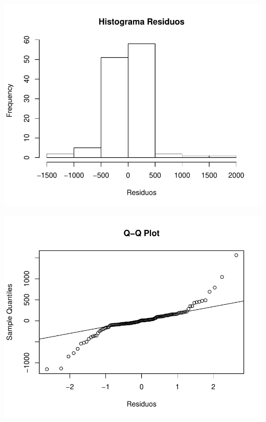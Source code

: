 \documentclass[11pt,a4paper,oneside]{article}\usepackage[]{graphicx}\usepackage[]{color}
\makeatletter
\def\maxwidth{ %
  \ifdim\Gin@nat@width>\linewidth
    \linewidth
  \else
    \Gin@nat@width
  \fi
}
\newenvironment{knitrout}{}{} %
\makeatother
\begin{document}
\begin{knitrout}
{\centering \includegraphics[width=\maxwidth]{figure/unnamed-chunk-16-47} 

}




{\centering \includegraphics[width=\maxwidth]{figure/unnamed-chunk-16-48} 

}





\end{knitrout}
\end{document}
